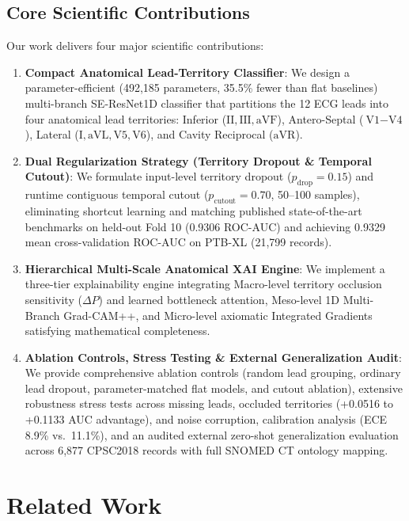 \documentclass[12pt]{elsarticle}
\begin{document}
\subsection{Core Scientific Contributions}
Our work delivers four major scientific contributions:
\begin{enumerate}
    \item \textbf{Compact Anatomical Lead-Territory Classifier}: We design a parameter-efficient (492,185 parameters, 35.5\% fewer than flat baselines) multi-branch SE-ResNet1D classifier that partitions the 12 ECG leads into four anatomical lead territories: Inferior ($\text{II}, \text{III}, \text{aVF}$), Antero-Septal ($\text{V1}-\text{V4}$), Lateral ($\text{I}, \text{aVL}, \text{V5}, \text{V6}$), and Cavity Reciprocal ($\text{aVR}$).
    \item \textbf{Dual Regularization Strategy (Territory Dropout \& Temporal Cutout)}: We formulate input-level territory dropout ($p_{\text{drop}} = 0.15$) and runtime contiguous temporal cutout ($p_{\text{cutout}} = 0.70$, 50--100 samples), eliminating shortcut learning and matching published state-of-the-art benchmarks on held-out Fold 10 (0.9306 ROC-AUC) and achieving 0.9329 mean cross-validation ROC-AUC on PTB-XL (21,799 records).
    \item \textbf{Hierarchical Multi-Scale Anatomical XAI Engine}: We implement a three-tier explainability engine integrating Macro-level territory occlusion sensitivity ($\Delta P$) and learned bottleneck attention, Meso-level 1D Multi-Branch Grad-CAM++, and Micro-level axiomatic Integrated Gradients satisfying mathematical completeness.
    \item \textbf{Ablation Controls, Stress Testing \& External Generalization Audit}: We provide comprehensive ablation controls (random lead grouping, ordinary lead dropout, parameter-matched flat models, and cutout ablation), extensive robustness stress tests across missing leads, occluded territories (+0.0516 to +0.1133 AUC advantage), and noise corruption, calibration analysis (ECE 8.9\% vs.\ 11.1\%), and an audited external zero-shot generalization evaluation across 6,877 CPSC2018 records with full SNOMED CT ontology mapping.
\end{enumerate}

\section{Related Work}
\label{sec:related}
\end{document}
